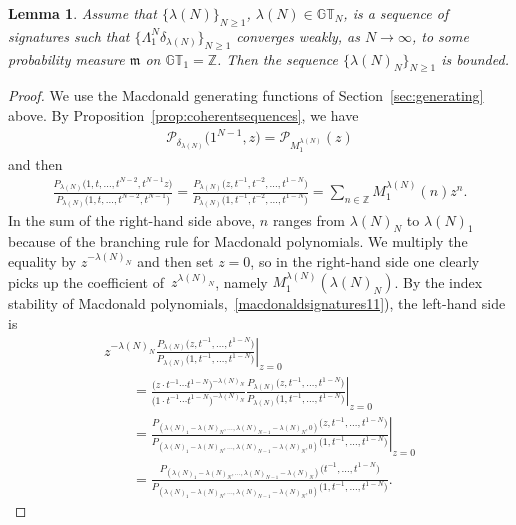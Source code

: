\documentclass[pdftex]{sigma}
\numberwithin{equation}{section}
\newtheorem{lem}[thm]{Lemma}
\newcommand{\Z}{\mathbb{Z}}
\newcommand{\GT}{\mathbb{GT}}
\newcommand{\PPP}{\mathcal{P}}
\begin{document}
\begin{lem}\label{lem:boundedparts0}
Assume that $\{\lambda(N)\}_{N\geq 1}$, $\lambda(N)\in\GT_N$, is a sequence of signatures such that $\{\Lambda^N_1\delta_{\lambda(N)}\}_{N\geq 1}$ converges weakly, as $N\rightarrow\infty$, to some probability measure $\mathfrak{m}$ on $\GT_1 = \Z$. Then the sequence $\{\lambda(N)_N\}_{N\geq 1}$ is bounded.
\end{lem}

\begin{proof}
We use the Macdonald generating functions of Section~\ref{sec:generating} above. By Proposition~\ref{prop:coherentsequences}, we have
\begin{gather*}
\PPP_{\delta_{\lambda(N)}}\big(1^{N-1}, z\big) = \PPP_{M^{\lambda(N)}_1}(z)
\end{gather*}
and then
\begin{gather}\label{eqn:taylors}
\frac{P_{\lambda(N)}\big(1, t, \dots, t^{N-2}, t^{N-1}z\big)}{P_{\lambda(N)}\big(1, t, \dots, t^{N-2}, t^{N-1}\big)}
= \frac{P_{\lambda(N)}\big(z, t^{-1}, t^{-2}, \dots, t^{1-N}\big)}{P_{\lambda(N)}\big(1, t^{-1}, t^{-2}, \dots, t^{1-N}\big)}
= \sum_{n\in\Z}{M^{\lambda(N)}_1(n)z^n}.
\end{gather}
In the sum of the right-hand side above, $n$ ranges from $\lambda(N)_N$ to $\lambda(N)_1$ because of the branching rule for Macdonald polynomials. We multiply the equality by $z^{-\lambda(N)_N}$ and then set $z = 0$, so in the right-hand side one clearly picks up the coef\/f\/icient of~$z^{\lambda(N)_N}$, namely $M^{\lambda(N)}_1 (\lambda(N)_N)$. By the index stability of Macdonald polynomials,~\ref{macdonaldsignatures11}), the left-hand side is
\begin{gather*}
\left.z^{-\lambda(N)_N}\frac{P_{\lambda(N)}\big(z, t^{-1}, \dots, t^{1-N}\big)}{P_{\lambda(N)}\big(1, t^{-1}, \dots, t^{1-N}\big)}\right|_{z=0} \\
\qquad{} = \left.\frac{\big(z\cdot t^{-1}\cdots t^{1-N}\big)^{-\lambda(N)_N}}{\big(1\cdot t^{-1}\cdots t^{1-N}\big)^{-\lambda(N)_N}}\frac{P_{\lambda(N)}\big(z, t^{-1}, \dots, t^{1-N}\big)}{P_{\lambda(N)}\big(1, t^{-1}, \dots, t^{1-N}\big)}\right|_{z=0}\\
\qquad{} = \left.\frac{P_{(\lambda(N)_1 - \lambda(N)_N, \dots, \lambda(N)_{N-1}-\lambda(N)_N, 0)}\big(z, t^{-1}, \dots, t^{1-N}\big)}{P_{(\lambda(N)_1 - \lambda(N)_N, \dots, \lambda(N)_{N-1}-\lambda(N)_N, 0)}\big(1, t^{-1}, \dots, t^{1-N}\big)}\right|_{z=0}\\
\qquad{} = \frac{P_{(\lambda(N)_1 - \lambda(N)_N, \dots, \lambda(N)_{N-1}-\lambda(N)_N)}\big(t^{-1}, \dots, t^{1-N}\big)}{P_{(\lambda(N)_1 - \lambda(N)_N, \dots, \lambda(N)_{N-1}-\lambda(N)_N, 0)}\big(1, t^{-1}, \dots, t^{1-N}\big)}.

\end{gather*}
\end{proof}
\end{document}
